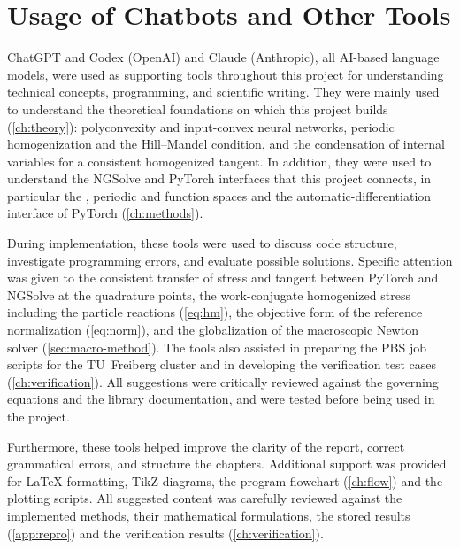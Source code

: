 \chapter{Usage of Chatbots and Other Tools}\label{ch:chatbots}

ChatGPT and Codex (OpenAI) and Claude (Anthropic), all AI-based language models,
were used as supporting tools throughout this project for understanding technical
concepts, programming, and scientific writing. They were mainly used to understand
the theoretical foundations on which this project builds (\cref{ch:theory}):
polyconvexity and input-convex neural networks, periodic homogenization and the
Hill--Mandel condition, and the condensation of internal variables for a consistent
homogenized tangent. In addition, they were used to understand the NGSolve and
PyTorch interfaces that this project connects, in particular the
, periodic and  function spaces and the
automatic-differentiation interface of PyTorch (\cref{ch:methods}).

During implementation, these tools were used to discuss code structure, investigate
programming errors, and evaluate possible solutions. Specific attention was given to
the consistent transfer of stress and tangent between PyTorch and NGSolve at the
quadrature points, the work-conjugate homogenized stress including the particle
reactions (\cref{eq:hm}), the objective form of the reference normalization
(\cref{eq:norm}), and the globalization of the macroscopic Newton solver
(\cref{sec:macro-method}). The tools also assisted in preparing the PBS job scripts
for the TU~Freiberg cluster and in developing the verification test cases
(\cref{ch:verification}). All suggestions were critically reviewed against the
governing equations and the library documentation, and were tested before being
used in the project.

Furthermore, these tools helped improve the clarity of the report, correct
grammatical errors, and structure the chapters. Additional support was provided for
\LaTeX{} formatting, TikZ diagrams, the program flowchart (\cref{ch:flow}) and the
plotting scripts. All suggested content was carefully reviewed against the
implemented methods, their mathematical formulations, the stored results
(\cref{app:repro}) and the verification results (\cref{ch:verification}).
